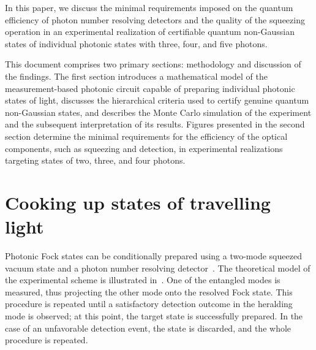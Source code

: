 \documentclass{article}
\begin{document}
In this paper, we discuss the minimal requirements imposed on the quantum efficiency of photon number resolving detectors and the quality of the squeezing operation in an experimental realization of certifiable quantum non-Gaussian states of individual photonic states with three, four, and five photons.

This document comprises two primary sections: methodology and discussion of the findings. The first section introduces a mathematical model of the measurement-based photonic circuit capable of preparing individual photonic states of light, discusses the hierarchical criteria used to certify genuine quantum non-Gaussian states, and describes the Monte Carlo simulation of the experiment and the subsequent interpretation of its results. Figures presented in the second section determine the minimal requirements for the efficiency of the optical components, such as squeezing and detection, in experimental realizations targeting states of two, three, and four photons.


%

\section{Cooking up states of travelling light}

Photonic Fock states can be conditionally prepared using a two-mode squeezed vacuum state and a photon number resolving detector~\cite{yukawa2013a,yoshikawa2018,tiedau2019,provaznik2020}. The theoretical model of the experimental scheme is illustrated in~. One of the entangled modes is measured, thus projecting the other mode onto the resolved Fock state. This procedure is repeated until a satisfactory detection outcome in the heralding mode is observed; at this point, the target state is successfully prepared. In the case of an unfavorable detection event, the state is discarded, and the whole procedure is repeated.
\end{document}
